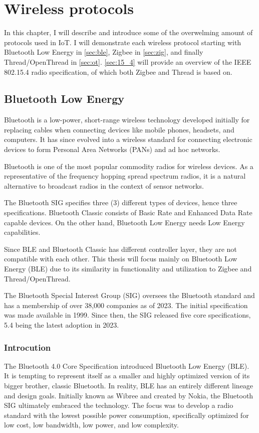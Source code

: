 \section{Wireless protocols}
\label{chap:wireless}

In this chapter, I will describe and introduce some of the overwelming amount of protocols used in IoT.
I will demonstrate each wireless protocol starting with Bluetooth Low Energy in \autoref{sec:ble},
Zigbee in \autoref{sec:zig}, and finally Thread/OpenThread in \autoref{sec:ot}.
\autoref{sec:15_4} will provide an overview of the IEEE 802.15.4 radio specification, of which both Zigbee and Thread is based on.

\subsection{Bluetooth Low Energy}
\label{sec:ble}

Bluetooth is a low-power, short-range wireless technology developed initially for replacing cables when connecting devices like mobile phones, headsets, and computers. It has since evolved into a wireless standard for connecting electronic devices to form Personal Area Networks (PANs) and ad hoc networks. \cite{Dideles03}

Bluetooth is one of the most popular commodity radios for wireless devices.
As a representative of the frequency hopping spread spectrum radios,
it is a natural alternative to broadcast radios in the context of sensor networks. \cite{Leopold03}

The Bluetooth SIG specifies three (3) different types of devices, hence three specifications.
Bluetooth Classic consists of Basic Rate and Enhanced Data Rate capable devices.
On the other hand, Bluetooth Low Energy needs Low Energy capabilities.

Since BLE and Bluetooth Classic has different controller layer, they are not compatible with each other.
This thesis will focus mainly on Bluetooth Low Energy (BLE) due to its
similarity in functionality and utilization to Zigbee and Thread/OpenThread.


The Bluetooth Special Interest Group (SIG) oversees
the Bluetooth standard and has a membership of over 38,000 companies as of 2023. \cite{bt_history}
The initial specification was made available in 1999.
Since then, the SIG released five core specifications, 5.4 being the latest adoption in 2023. \cite{bt_spec_history}

\subsubsection{Introcution}
\label{ble:int}
The Bluetooth 4.0 Core Specification introduced Bluetooth Low Energy (BLE).
It is tempting to represent itself as a smaller and highly optimized version of
its bigger brother, classic Bluetooth. In reality, BLE has an entirely different lineage and design goals.
Initially known as Wibree and created by Nokia, the Bluetooth SIG ultimately embraced the technology.
The focus was to develop a radio standard with the lowest possible power consumption,
specifically optimized for low cost, low bandwidth, low power, and low complexity. \cite{Townsend14}

